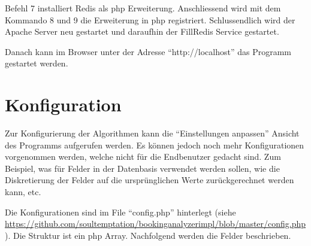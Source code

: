 Befehl 7 installiert Redis als \gls{php} Erweiterung. Anschliessend wird mit dem Kommando 8 und 9 die Erweiterung in \gls{php} registriert. Schlussendlich wird der Apache Server neu gestartet und daraufhin der FillRedis Service gestartet.

Danach kann im Browser unter der Adresse "`http://localhost"' das Programm gestartet werden.

\section{Konfiguration}
\label{sec:proofofconcept:konfiguration}
Zur Konfigurierung der Algorithmen kann die "`Einstellungen anpassen"' Ansicht des Programms aufgerufen werden. Es können jedoch noch mehr Konfigurationen vorgenommen werden, welche nicht für die Endbenutzer gedacht sind. Zum Beispiel, was für Felder in der Datenbasis verwendet werden sollen, wie die Diskretierung der Felder auf die ursprünglichen Werte zurückgerechnet werden kann, etc. 

Die Konfigurationen sind im File "`config.php"' hinterlegt (siehe \url{https://github.com/soultemptation/bookinganalyzerimpl/blob/master/config.php}). Die Struktur ist ein \gls{php} Array. Nachfolgend werden die Felder beschrieben.


